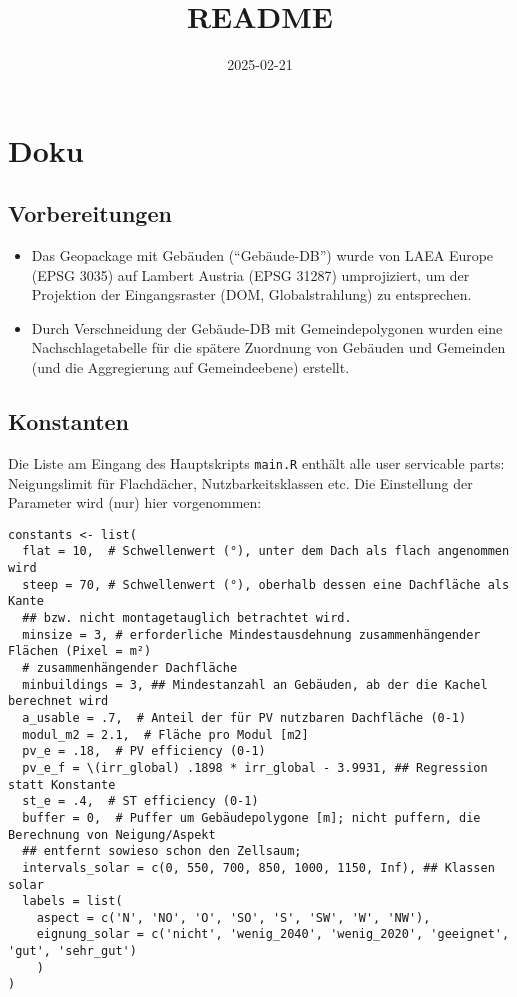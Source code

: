 \documentclass[
]{article}
\title{README}
\author{}
\date{\vspace{-2.5em}2025-02-21}
\begin{document}
\maketitle

\section{Doku}\label{doku}

\subsection{Vorbereitungen}\label{vorbereitungen}

\begin{itemize}
\item
  Das Geopackage mit Gebäuden (``Gebäude-DB'') wurde von LAEA Europe
  (EPSG 3035) auf Lambert Austria (EPSG 31287) umprojiziert, um der
  Projektion der Eingangsraster (DOM, Globalstrahlung) zu entsprechen.
\item
  Durch Verschneidung der Gebäude-DB mit Gemeindepolygonen wurden eine
  Nachschlagetabelle für die spätere Zuordnung von Gebäuden und
  Gemeinden (und die Aggregierung auf Gemeindeebene) erstellt.
\end{itemize}

\subsection{Konstanten}\label{konstanten}

Die Liste am Eingang des Hauptskripts \texttt{main.R} enthält alle user
servicable parts: Neigungslimit für Flachdächer, Nutzbarkeitsklassen
etc. Die Einstellung der Parameter wird (nur) hier vorgenommen:

\begin{verbatim}
constants <- list(
  flat = 10,  # Schwellenwert (°), unter dem Dach als flach angenommen wird
  steep = 70, # Schwellenwert (°), oberhalb dessen eine Dachfläche als Kante
  ## bzw. nicht montagetauglich betrachtet wird.
  minsize = 3, # erforderliche Mindestausdehnung zusammenhängender Flächen (Pixel = m²)
  # zusammenhängender Dachfläche
  minbuildings = 3, ## Mindestanzahl an Gebäuden, ab der die Kachel berechnet wird
  a_usable = .7,  # Anteil der für PV nutzbaren Dachfläche (0-1)
  modul_m2 = 2.1,  # Fläche pro Modul [m2]
  pv_e = .18,  # PV efficiency (0-1)
  pv_e_f = \(irr_global) .1898 * irr_global - 3.9931, ## Regression statt Konstante
  st_e = .4,  # ST efficiency (0-1)
  buffer = 0,  # Puffer um Gebäudepolygone [m]; nicht puffern, die Berechnung von Neigung/Aspekt 
  ## entfernt sowieso schon den Zellsaum;
  intervals_solar = c(0, 550, 700, 850, 1000, 1150, Inf), ## Klassen solar
  labels = list(
    aspect = c('N', 'NO', 'O', 'SO', 'S', 'SW', 'W', 'NW'),
    eignung_solar = c('nicht', 'wenig_2040', 'wenig_2020', 'geeignet', 'gut', 'sehr_gut')
    )
)
\end{verbatim}
\end{document}
